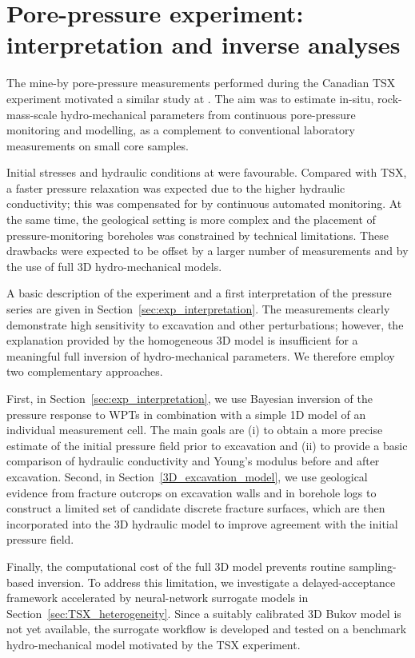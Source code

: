 \chapter{Pore-pressure experiment: interpretation and inverse analyses}
\label{ch:inversion}

The mine-by pore-pressure measurements performed during the Canadian \acrshort{TSX} experiment motivated a similar study at \URFBII. 
The aim was to estimate in-situ, rock-mass-scale hydro-mechanical parameters from continuous pore-pressure monitoring and modelling, as a complement to conventional laboratory measurements on small core samples.

Initial stresses and hydraulic conditions at \URFB were favourable. Compared with \acrshort{TSX}, a faster pressure relaxation was expected due to the higher hydraulic conductivity; this was compensated for by continuous automated monitoring. At the same time, the geological setting is more complex and the placement of pressure-monitoring boreholes was constrained by technical limitations. These drawbacks were expected to be offset by a larger number of measurements and by the use of full 3D hydro-mechanical models.

A basic description of the experiment and a first interpretation of the pressure series are given in Section~\ref{sec:exp_interpretation}. The measurements clearly demonstrate high sensitivity to excavation and other perturbations; however, the explanation provided by the homogeneous 3D model is insufficient for a meaningful full inversion of hydro-mechanical parameters. We therefore employ two complementary approaches.


First, in Section~\ref{sec:exp_interpretation}, we use Bayesian inversion of the pressure response to \gls{WPT}s in combination with a simple 1D model of an individual measurement cell. The main goals are (i) to obtain a more precise estimate of the initial pressure field prior to excavation and (ii) to provide a basic comparison of hydraulic conductivity and Young’s modulus before and after excavation. Second, in Section~\ref{3D_excavation_model}, we use geological evidence from fracture outcrops on excavation walls and in borehole logs to construct a limited set of candidate discrete fracture surfaces, which are then incorporated into the 3D hydraulic model to improve agreement with the initial pressure field.

Finally, the computational cost of the full 3D model prevents routine sampling-based inversion. To address this limitation, we investigate a delayed-acceptance framework accelerated by neural-network surrogate models in Section~\ref{sec:TSX_heterogeneity}. Since a suitably calibrated 3D Bukov model is not yet available, the surrogate workflow is developed and tested on a benchmark hydro-mechanical model motivated by the \acrshort{TSX} experiment.





